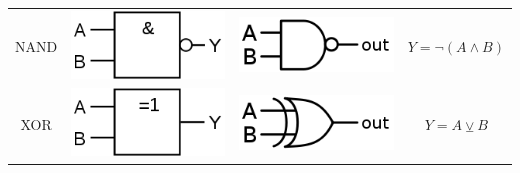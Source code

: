 \documentclass[a4paper,10pt]{report}
\begin{document}
\begin{center}
\begin{tabular}{c c c c}
NAND & \includegraphics[scale=0.2]{imgs/gatter_IEC_NAND.png} & \includegraphics[scale=0.2]{imgs/gatter_ANSI_NAND.png} &  $Y = \lnot (A \land B)$ \\
XOR & \includegraphics[scale=0.2]{imgs/gatter_IEC_XOR.png} & \includegraphics[scale=0.2]{imgs/gatter_ANSI_XOR.png} &  $Y = A \veebar B$
\end{tabular}\end{center}
\end{document}
